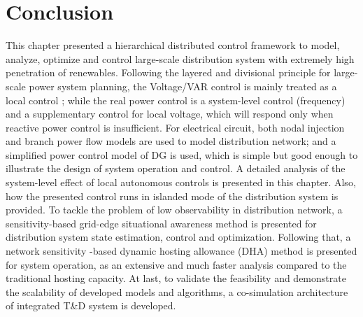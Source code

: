 \documentclass{article}
\begin{document}
\newpage
\section{Conclusion}
This chapter presented a hierarchical distributed control framework to model, analyze, optimize and control large-scale distribution system with extremely high penetration of renewables. Following the layered and divisional principle for large-scale power system planning, the Voltage/VAR control is mainly treated as a local control ; while the real power control is a system-level control (frequency) and a supplementary control for local voltage, which will respond only when reactive power control is insufficient. 
For electrical circuit, both nodal injection and branch power flow models are used to model distribution network; and a simplified power control model of DG is used, which is simple but good enough to illustrate the design of system operation and control. A detailed analysis of the system-level effect of local autonomous controls is presented in this chapter. Also, how the presented control runs in islanded mode of the distribution system is provided.
To tackle the problem of low observability in distribution network, a sensitivity-based grid-edge situational awareness method is presented for distribution system state estimation, control and optimization. Following that, a network sensitivity -based dynamic hosting allowance (DHA) method is presented for system operation, as an extensive and much faster analysis compared to the traditional hosting capacity. At last, to validate the feasibility and demonstrate the scalability of developed models and algorithms, a co-simulation architecture of integrated T\&D system is developed.




\end{document}
